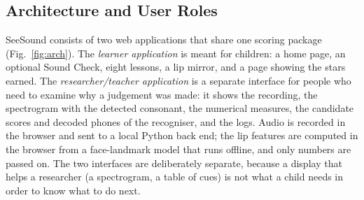 \documentclass[conference]{IEEEtran}
\begin{document}
\subsection{Architecture and User Roles}
SeeSound consists of two web applications that share one scoring package (Fig.~\ref{fig:arch}). The \emph{learner application} is meant for children: a home page, an optional Sound Check, eight lessons, a lip mirror, and a page showing the stars earned. The \emph{researcher/teacher application} is a separate interface for people who need to examine why a judgement was made: it shows the recording, the spectrogram with the detected consonant, the numerical measures, the candidate scores and decoded phones of the recogniser, and the logs. Audio is recorded in the browser and sent to a local Python back end; the lip features are computed in the browser from a face-landmark model that runs offline, and only numbers are passed on. The two interfaces are deliberately separate, because a display that helps a researcher (a spectrogram, a table of cues) is not what a child needs in order to know what to do next.
\end{document}
